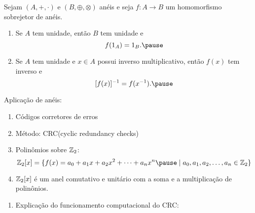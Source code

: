 \documentclass{beamer}
\begin{document}
    \begin{frame}
        \begin{proposicao}
            Sejam $(A, +, \cdot)$ e $(B, \oplus, \otimes)$ an\'eis \pause e seja $f : A \to B$ um homomorfismo sobrejetor de an\'eis.\pause
            \begin{enumerate}[label={\roman*})]
                \item Se $A$ tem unidade, \pause ent\~ao $B$ tem unidade e\pause
                \[
                    f(1_A) = 1_B.\pause
                \]

                \vspace{.5cm}

                \item Se $A$ tem unidade \pause e $x \in A$ \pause possui inverso multiplicativo, \pause ent\~ao $f(x)$ \pause tem inverso e\pause
                \[
                    [f(x)]^{-1} = f(x^{-1}).\pause
                \]

                \vspace{.5cm}
            \end{enumerate}
        \end{proposicao}
    \end{frame}

    \begin{frame}
        Aplicação de anéis:
        \begin{enumerate}[label={\arabic*})]
            \item Códigos corretores de erros\pause

            \item Método: CRC(cyclic redundancy checks)\pause

            \item Polinômios sobre $\mathbb{Z}_2$:\pause
                \[\z_2[x] = \{f(x) = a_0 + a_1x + a_2x^2 + \cdots + a_nx^n \pause \mid a_0, a_1, a_2, \dots, a_n \in \z_2\}\]\pause
            \item $\mathbb{Z}_2[x]$ é um anel comutativo e unitário com a soma e a multiplicação de polinônios.\pause

            \seti
        \end{enumerate}
    \end{frame}

    \begin{frame}
        \begin{enumerate}[label={\arabic*})]
            \conti
            \item Explicação do funcionamento computacional do CRC:\\
                \begin{center}
                \end{center}
        \end{enumerate}
    \end{frame}
\end{document}
